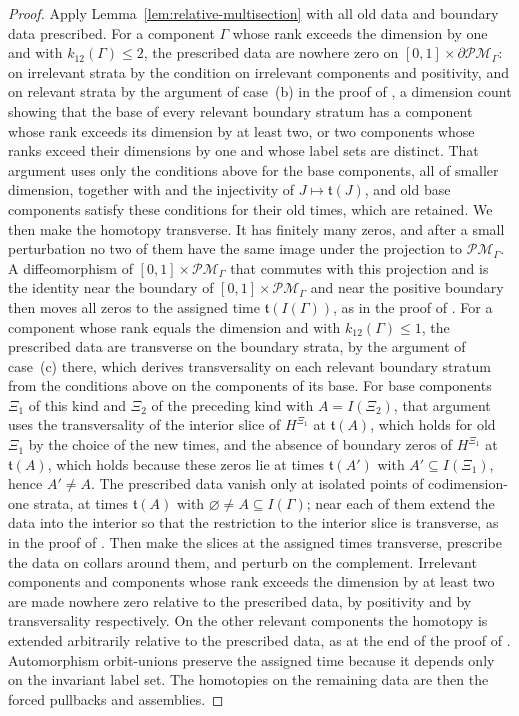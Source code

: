 \begin{proof}
Apply Lemma~\ref{lem:relative-multisection} with all old data and boundary
data prescribed.  For a component $\Gamma$ whose rank exceeds the dimension
by one and with $k_{12}(\Gamma)\leq2$, the prescribed data are nowhere zero
on $[0,1]\times\partial\mathcal{PM}_\Gamma$: on irrelevant strata by the
condition on irrelevant components and positivity, and on relevant strata by
the argument of case~(b) in the proof of \cite[Lem.~3.40]{grossetal2022open},
a dimension count showing that the base of every relevant boundary stratum
has a component whose rank exceeds its dimension by at least two, or two
components whose ranks exceed their dimensions by one and whose label sets
are distinct.
That argument uses only the conditions above for the base components, all of
smaller dimension, together with \cite[Lem.~3.39]{grossetal2022open} and the
injectivity of $J\mapsto\mathfrak t(J)$, and old base components satisfy these
conditions for their old times, which are retained.  We then make the
homotopy transverse.  It has finitely many zeros, and after a small
perturbation no two of them have the same image under the projection to
$\mathcal{PM}_\Gamma$.  A diffeomorphism of $[0,1]\times\mathcal{PM}_\Gamma$
that commutes with this projection and is the identity near the boundary of
$[0,1]\times\mathcal{PM}_\Gamma$ and near the positive boundary then moves
all zeros to the assigned time $\mathfrak t(I(\Gamma))$, as in the proof of
\cite[Lem.~3.40]{grossetal2022open}.  For a component whose rank equals the dimension and with
$k_{12}(\Gamma)\leq1$, the prescribed data are transverse on the boundary
strata, by the argument of case~(c) there, which derives transversality on
each relevant boundary stratum from the conditions above on the components
of its base.  For base components $\Xi_1$ of
this kind and $\Xi_2$ of the preceding kind with $A=I(\Xi_2)$, that argument
uses the transversality of the interior slice of $H^{\Xi_1}$ at
$\mathfrak t(A)$, which holds for old $\Xi_1$ by the choice of the new times, and
the absence of boundary zeros of $H^{\Xi_1}$ at $\mathfrak t(A)$, which holds
because these zeros lie at times $\mathfrak t(A')$ with
$A'\subseteq I(\Xi_1)$, hence $A'\neq A$.  The prescribed data vanish only at
isolated points of codimension-one strata, at times $\mathfrak t(A)$ with
$\varnothing\neq A\subseteq I(\Gamma)$; near each of them extend the data into
the interior so that the restriction to the interior slice is transverse, as
in the proof of \cite[Lem.~3.40(3)(b)]{grossetal2022open}.  Then make the
slices at the assigned times transverse, prescribe the data on collars around
them, and perturb on the complement.  Irrelevant
components and components whose rank exceeds the dimension by at least two
are made nowhere zero relative to the prescribed data, by positivity and by
transversality respectively.  On the other relevant components the homotopy
is extended arbitrarily relative to the prescribed data, as at the end of the
proof of \cite[Lem.~3.40]{grossetal2022open}.  Automorphism orbit-unions preserve the
assigned time because it depends only on the invariant label set.  The
homotopies on the remaining data are then the forced pullbacks and
assemblies.
\end{proof}


